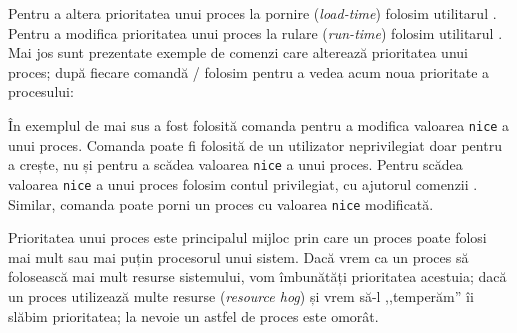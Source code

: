 Pentru a altera prioritatea unui proces la pornire (\textit{load-time}) folosim
utilitarul . Pentru a modifica prioritatea unui proces la rulare (\textit{run-time})
folosim utilitarul . Mai jos sunt prezentate exemple de comenzi care
alterează prioritatea unui proces; după fiecare comandă  /  folosim 
pentru a vedea acum noua prioritate a procesului:


În exemplul de mai sus a fost folosită comanda  pentru a modifica valoarea \texttt{nice} a unui proces. Comanda poate fi folosită de un utilizator neprivilegiat doar pentru a crește, nu și pentru a scădea valoarea \texttt{nice} a unui proces. Pentru scădea valoarea \texttt{nice} a unui proces folosim contul privilegiat, cu ajutorul comenzii . Similar, comanda  poate porni un proces cu valoarea \texttt{nice} modificată.

Prioritatea unui proces este principalul mijloc prin care un proces poate folosi
mai mult sau mai puțin procesorul unui sistem. Dacă vrem ca un proces să
folosească mai mult resurse sistemului, vom îmbunătăți prioritatea acestuia;
dacă un proces utilizează multe resurse (\textit{resource hog}) și vrem să-l
,,temperăm'' îi slăbim prioritatea; la nevoie un astfel de proces este omorât.

